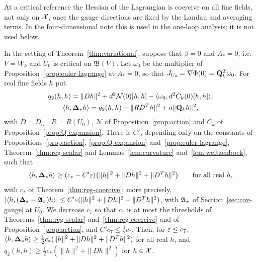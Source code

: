 At a critical reference the Hessian of the Lagrangian is coercive on all fine fields, not only on $\mathcal X$, once the gauge directions are fixed by the Landau and averaging terms. In the four-dimensional note this is used in the one-loop analysis; it is not used below.

\begin{lemma}\label{lem:Lstar-coercive}
In the setting of Theorem~\ref{thm:variational}, suppose that $\beta=0$ and $A_*=0$, i.e.\ $V=W_k$ and $U_0$ is critical on $\mathfrak B(V)$. Let $\omega_0$ be the multiplier of Proposition~\ref{prop:euler-lagrange} at $A_*=0$, so that $J_{U_0}=\nabla\Phi(0)=\mathbf Q_k^T\omega_0$. For real fine fields $h$ put
\[
\begin{gathered}
q_2(h,h)=\|Dh\|^2+d^2\mathcal N(0)[h,h]-\langle \omega_0,d^2C_k(0)[h,h]\rangle,\\
\langle h,\boldsymbol{\Delta}_*h\rangle=q_2(h,h)+\|RD^Th\|^2+a\|\mathbf Q_kh\|^2,
\end{gathered}
\]
with $D=D_{U_0}$, $R=R(U_0)$, $\mathcal N$ of Proposition~\ref{prop:action} and $C_k$ of Proposition~\ref{prop:Q-expansion}. There is $C'$, depending only on the constants of Propositions~\ref{prop:action}, \ref{prop:Q-expansion} and~\ref{prop:euler-lagrange}, Theorem~\ref{thm:reg-scalar} and Lemmas~\ref{lem:curvature} and~\ref{lem:weitzenbock}, such that
\begin{equation}\label{eq:Lstar-coercive}
\langle h,\boldsymbol{\Delta}_*h\rangle\ge(c_*-C'\varepsilon)\big(\|h\|^2+\|Dh\|^2+\|D^Th\|^2\big)\qquad\text{for all real }h,
\end{equation}
with $c_*$ of Theorem~\ref{thm:reg-coercive}; more precisely, $|\langle h,(\boldsymbol{\Delta}_*-\mathfrak A_\pi)h\rangle|\le C'\varepsilon(\|h\|^2+\|Dh\|^2+\|D^Th\|^2)$, with $\mathfrak A_\pi$ of Section~\ref{sec:cov-gauge} at $U_0$. We decrease $c_7$ so that $c_7$ is at most the thresholds of Theorems~\ref{thm:reg-scalar} and~\ref{thm:reg-coercive} and of Proposition~\ref{prop:action}, and $C'c_7\le\frac12c_*$. Then, for $\varepsilon\le c_7$, $\langle h,\boldsymbol{\Delta}_*h\rangle\ge\frac12c_*(\|h\|^2+\|Dh\|^2+\|D^Th\|^2)$ for all real $h$, and $q_2(h,h)\ge\frac12c_*(\|h\|^2+\|Dh\|^2)$ for $h\in\mathcal X$.
\end{lemma}

